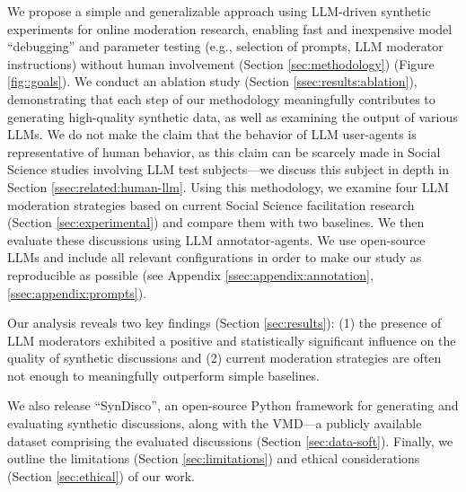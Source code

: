 We propose a simple and generalizable approach using \ac{LLM}-driven synthetic experiments for online moderation research, enabling fast and inexpensive model “debugging” and parameter testing (e.g., selection of prompts, \ac{LLM} moderator instructions) without human involvement (Section \ref{sec:methodology}) (Figure \ref{fig::goals}). We conduct an ablation study (Section \ref{ssec:results:ablation}), demonstrating that each step of our methodology meaningfully contributes to generating high-quality synthetic data, as well as examining the output of various \acp{LLM}. We do not make the claim that the behavior of \ac{LLM} user-agents is representative of human behavior, as this claim can be scarcely made in Social Science studies involving \ac{LLM} test subjects—we discuss this subject in depth in Section \ref{ssec:related:human-llm}. Using this methodology, we examine four \ac{LLM} moderation strategies based on current Social Science facilitation research (Section \ref{sec:experimental})
and compare them with two baselines. We then evaluate these discussions using \ac{LLM} annotator-agents. We use open-source \acp{LLM} and include all relevant configurations in order to make our study as reproducible as possible (see Appendix \ref{ssec:appendix:annotation}, \ref{ssec:appendix:prompts}).


 Our analysis reveals two key findings (Section \ref{sec:results}): (1) the presence of \ac{LLM} moderators exhibited a positive and statistically significant influence on the quality of synthetic discussions and (2) current moderation strategies are often not enough to meaningfully outperform simple baselines. %

We also release “SynDisco”, an open-source Python framework for generating and evaluating synthetic discussions, along with the \acf{VMD}\datasetlink—a publicly available dataset comprising the evaluated discussions (Section \ref{sec:data-soft}). Finally, we outline the limitations (Section \ref{sec:limitations}) and ethical considerations (Section \ref{sec:ethical}) of our work.